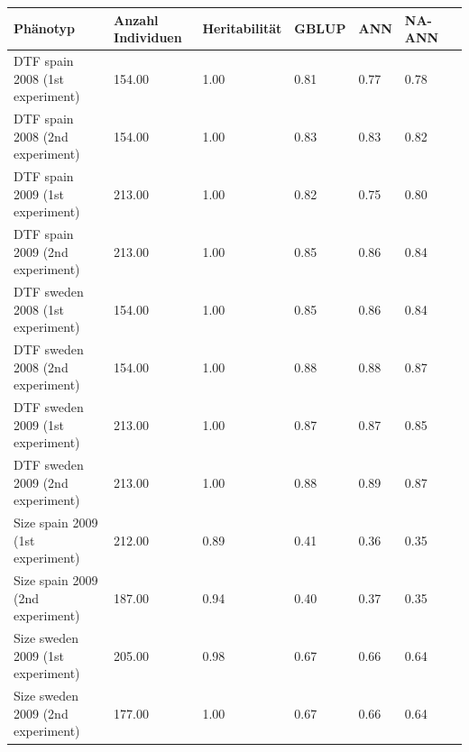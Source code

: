 \documentclass[ngerman,onecolumn,bibliography=totocnumbered]{scrreprt}
\begin{document}
\begin{table}[]
\begin{tabular}{|l|l|l|l|l|l|l|}
\hline
Phänotyp 					& Anzahl Individuen & Heritabilität & GBLUP & ANN 	 & NA-ANN \\ \hline
DTF spain 2008 (1st experiment)  & 154.00  & 1.00  & 0.81  & 0.77  & 0.78 \\ \hline
DTF spain 2008 (2nd experiment)  & 154.00  & 1.00  & 0.83  & 0.83  & 0.82 \\ \hline
DTF spain 2009 (1st experiment)  & 213.00  & 1.00  & 0.82  & 0.75  & 0.80 \\ \hline
DTF spain 2009 (2nd experiment)  & 213.00  & 1.00  & 0.85  & 0.86  & 0.84 \\ \hline
DTF sweden 2008 (1st experiment)  & 154.00  & 1.00  & 0.85  & 0.86  & 0.84 \\ \hline
DTF sweden 2008 (2nd experiment)  & 154.00  & 1.00  & 0.88  & 0.88  & 0.87 \\ \hline
DTF sweden 2009 (1st experiment)  & 213.00  & 1.00  & 0.87  & 0.87  & 0.85 \\ \hline
DTF sweden 2009 (2nd experiment)  & 213.00  & 1.00  & 0.88  & 0.89  & 0.87 \\ \hline
Size spain 2009 (1st experiment)  & 212.00  & 0.89  & 0.41  & 0.36  & 0.35 \\ \hline
Size spain 2009 (2nd experiment)  & 187.00  & 0.94  & 0.40  & 0.37  & 0.35 \\ \hline
Size sweden 2009 (1st experiment)  & 205.00  & 0.98  & 0.67  & 0.66  & 0.64 \\ \hline
Size sweden 2009 (2nd experiment)  & 177.00  & 1.00  & 0.67  & 0.66  & 0.64 \\ \hline

\end{tabular}
\end{table}
\end{document}
